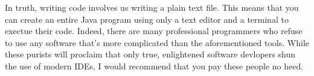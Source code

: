 In truth, writing code involves us writing a plain text file.
This means that you can create an entire Java program using only a text editor and a terminal to exectue their code.
Indeed, there are many professional programmers who refuse to use any software that's more complicated than the aforementioned tools.
While these purists will proclaim that only true, enlightened software devlopers shun the use of modern IDEs, I would recommend that you pay these people no heed.




